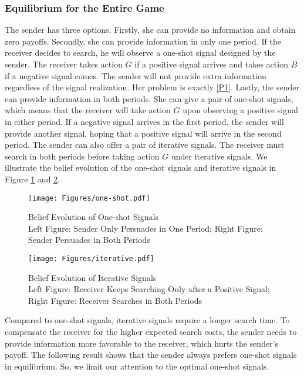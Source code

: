 \documentclass[11pt]{extarticle}
\begin{document}
\subsubsection{Equilibrium for the Entire Game}
The sender has three options. Firstly, she can provide no information and obtain zero payoffs. Secondly, she can provide information in only one period. If the receiver decides to search, he will observe a one-shot signal designed by the sender. The receiver takes action $G$ if a positive signal arrives and takes action $B$ if a negative signal comes. The sender will not provide extra information regardless of the signal realization. Her problem is exactly \eqref{P1}. Lastly, the sender can provide information in both periods. She can give a pair of one-shot signals, which means that the receiver will take action $G$ upon observing a positive signal in either period. If a negative signal arrives in the first period, the sender will provide another signal, hoping that a positive signal will arrive in the second period. The sender can also offer a pair of iterative signals. The receiver must search in both periods before taking action $G$ under iterative signals. We illustrate the belief evolution of the one-shot signals and iterative signals in Figure \ref{one-shot} and \ref{iterative}.


\begin{figure}[H]
	\centering
	\texttt{[image: Figures/one-shot.pdf]}
	\caption{Belief Evolution of One-shot Signals\\{\small Left Figure: Sender Only Persuades in One Period; Right Figure: Sender Persuades in Both Periods}}
	\label{one-shot}
\end{figure}

\begin{figure}[H]
	\centering
	\texttt{[image: Figures/iterative.pdf]}
	\caption{Belief Evolution of Iterative Signals\\{\small Left Figure: Receiver Keeps Searching Only after a Positive Signal; Right Figure: Receiver Searches in Both Periods}}
	\label{iterative}
\end{figure}

Compared to one-shot signals, iterative signals require a longer search time. To compensate the receiver for the higher expected search costs, the sender needs to provide information more favorable to the receiver, which hurts the sender's payoff. The following result shows that the sender always prefers one-shot signals in equilibrium. So, we limit our attention to the optimal one-shot signals.
\end{document}
